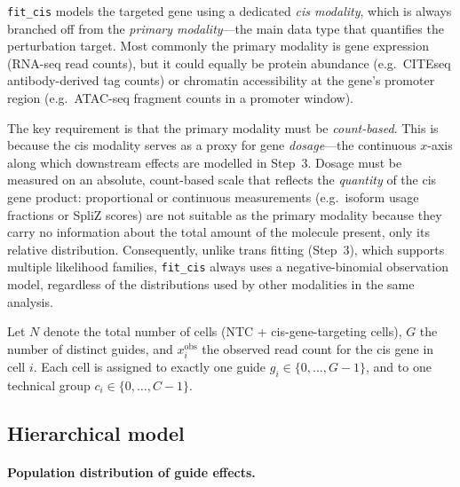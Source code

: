 \documentclass[12pt]{article}
\begin{document}
\texttt{fit\_cis} models the targeted gene using a dedicated \emph{cis modality},
which is always branched off from the \emph{primary modality}—the main data type
that quantifies the perturbation target.
%
Most commonly the primary modality is gene expression (RNA-seq read counts), but it
could equally be protein abundance (e.g.\ CITEseq antibody-derived tag counts) or
chromatin accessibility at the gene's promoter region (e.g.\ ATAC-seq fragment counts
in a promoter window).

The key requirement is that the primary modality must be \emph{count-based}.
This is because the cis modality serves as a proxy for gene \emph{dosage}—the
continuous $x$-axis along which downstream effects are modelled in Step~3.
Dosage must be measured on an absolute, count-based scale that reflects the
\emph{quantity} of the cis gene product: proportional or continuous measurements
(e.g.\ isoform usage fractions or SpliZ scores) are not suitable as the primary modality
because they carry no information about the total amount of the molecule present, only
its relative distribution.
%
Consequently, unlike trans fitting (Step~3), which supports multiple likelihood families,
\texttt{fit\_cis} always uses a negative-binomial observation model, regardless of the
distributions used by other modalities in the same analysis.

Let $N$ denote the total number of cells (NTC + cis-gene-targeting cells), $G$ the number of
distinct guides, and $x^{\mathrm{obs}}_i$ the observed read count for the cis gene in cell $i$.
Each cell is assigned to exactly one guide $g_i \in \{0, \ldots, G-1\}$, and to one technical
group $c_i \in \{0, \ldots, C-1\}$.

\subsection{Hierarchical model}

\paragraph{Population distribution of guide effects.}
\end{document}
